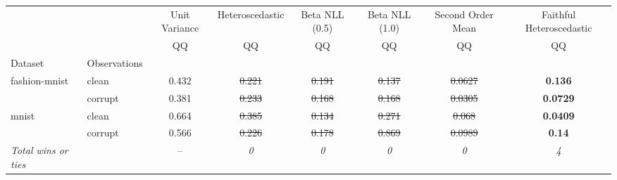\begin{tabular}{ll|c|c|c|c|c|c}
\toprule
{} & {} & {Unit Variance} & {Heteroscedastic} & {Beta NLL (0.5)} & {Beta NLL (1.0)} & {Second Order Mean} & {Faithful Heteroscedastic} \\
{} & {} & {QQ} & {QQ} & {QQ} & {QQ} & {QQ} & {QQ} \\
{Dataset} & {Observations} & {} & {} & {} & {} & {} & {} \\
\midrule
\multirow[t]{2}{*}{fashion-mnist} & clean & 0.432 & \sout{0.221} & \sout{0.191} & \sout{0.137} & \sout{0.0627} & \textbf{0.136} \\
 & corrupt & 0.381 & \sout{0.233} & \sout{0.168} & \sout{0.168} & \sout{0.0305} & \textbf{0.0729} \\
\multirow[t]{2}{*}{mnist} & clean & 0.664 & \sout{0.385} & \sout{0.134} & \sout{0.271} & \sout{0.068} & \textbf{0.0409} \\
 & corrupt & 0.566 & \sout{0.226} & \sout{0.178} & \sout{0.869} & \sout{0.0989} & \textbf{0.14} \\
\textit{{Total wins or ties}} &  & -- & \textit{0} & \textit{0} & \textit{0} & \textit{0} & \textit{4} \\
\bottomrule
\end{tabular}
